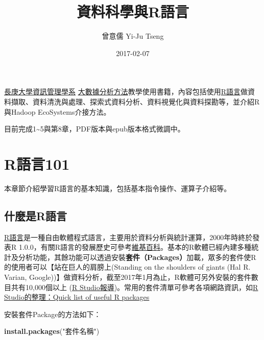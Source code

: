 \documentclass[]{book}
\title{資料科學與R語言}
\author{曾意儒 Yi-Ju Tseng}
\date{2017-02-07}
\newenvironment{Shaded}{\begin{snugshade}}{\end{snugshade}}
\newcommand{\KeywordTok}[1]{\textcolor[rgb]{0.13,0.29,0.53}{\textbf{{#1}}}}
\newcommand{\StringTok}[1]{\textcolor[rgb]{0.31,0.60,0.02}{{#1}}}
\newcommand{\NormalTok}[1]{{#1}}
\theoremstyle{definition}
\theoremstyle{definition}
\theoremstyle{remark}
\begin{document}
\maketitle

{
\setcounter{tocdepth}{1}
\tableofcontents
}
\hypertarget{preface}{\chapter*{}\label{preface}}

\href{http://im.cgu.edu.tw/bin/home.php}{長庚大學資訊管理學系}
\href{https://github.com/yijutseng/BigDataCGUIM}{大數據分析方法}教學使用書籍，內容包括使用\href{http://www.r-project.org/}{R語言}做資料擷取、資料清洗與處理、探索式資料分析、資料視覺化與資料探勘等，並介紹R與Hadoop
EcoSystems介接方法。

目前完成1\textasciitilde{}5與第8章，PDF版本與epub版本格式微調中。

\chapter{R語言101}\label{intro}

本章節介紹學習R語言的基本知識，包括基本指令操作、運算子介紹等。

\section{什麼是R語言}\label{r}

\href{http://www.r-project.org/}{R語言}是一種自由軟體程式語言，主要用於資料分析與統計運算，2000年時終於發表R
1.0.0，有關R語言的發展歷史可參考\href{https://zh.wikipedia.org/wiki/R\%E8\%AF\%AD\%E8\%A8\%80}{維基百科}。基本的R軟體已經內建多種統計及分析功能，其餘功能可以透過安裝\textbf{套件（Packages）}加載，眾多的套件使R的使用者可以【站在巨人的肩膀上(Standing
on the shoulders of giants (Hal R. Varian,
Google))】做資料分析，截至2017年1月為止，R軟體可另外安裝的套件數目共有10,000個以上
(\href{https://www.rstudio.com/rviews/2017/01/06/10000-cran-packages/}{R
Studio報導})。常用的套件清單可參考各項網路資訊，如\href{https://support.rstudio.com/hc/en-us/articles/201057987-Quick-list-of-useful-R-packages}{R
Studio的整理：Quick list of useful R packages}

安裝套件Package的方法如下：

\begin{Shaded}
\begin{Highlighting}[]
\KeywordTok{install.packages}\NormalTok{(}\StringTok{"套件名稱"}\NormalTok{)}
\end{Highlighting}
\end{Shaded}
\end{document}
